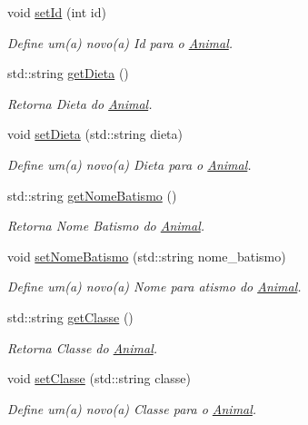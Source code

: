 \begin{DoxyCompactItemize}
void \hyperlink{classAnimal_af5a262e8a6e04632a48307101494925c}{set\+Id} (int id)
\begin{DoxyCompactList}\small\item\em Define um(a) novo(a) Id para o \hyperlink{classAnimal}{Animal}. \end{DoxyCompactList}\item 
std\+::string \hyperlink{classAnimal_a6fcb9a0b8debecb58ca20dbf88bce329}{get\+Dieta} ()
\begin{DoxyCompactList}\small\item\em Retorna Dieta do \hyperlink{classAnimal}{Animal}. \end{DoxyCompactList}\item 
void \hyperlink{classAnimal_a1b6ae4e4360c2a3b15c1759a654ef84b}{set\+Dieta} (std\+::string dieta)
\begin{DoxyCompactList}\small\item\em Define um(a) novo(a) Dieta para o \hyperlink{classAnimal}{Animal}. \end{DoxyCompactList}\item 
std\+::string \hyperlink{classAnimal_aee0219bd596f0af49fa51fcdad29a1a7}{get\+Nome\+Batismo} ()
\begin{DoxyCompactList}\small\item\em Retorna Nome Batismo do \hyperlink{classAnimal}{Animal}. \end{DoxyCompactList}\item 
void \hyperlink{classAnimal_a6f77d89ef0c02d85dfe1dd7508122ce3}{set\+Nome\+Batismo} (std\+::string nome\+\_\+batismo)
\begin{DoxyCompactList}\small\item\em Define um(a) novo(a) Nome para atismo do \hyperlink{classAnimal}{Animal}. \end{DoxyCompactList}\item 
std\+::string \hyperlink{classAnimal_a22e54ff48117237f9a201f5eca0eea81}{get\+Classe} ()
\begin{DoxyCompactList}\small\item\em Retorna Classe do \hyperlink{classAnimal}{Animal}. \end{DoxyCompactList}\item 
void \hyperlink{classAnimal_ae1956de8a017d0b1cd506935cd1a57e0}{set\+Classe} (std\+::string classe)
\begin{DoxyCompactList}\small\item\em Define um(a) novo(a) Classe para o \hyperlink{classAnimal}{Animal}. \end{DoxyCompactList}\item 

\end{DoxyCompactItemize}
